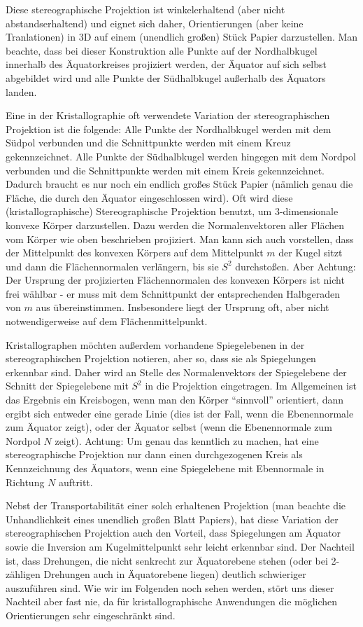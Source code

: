  Diese stereographische Projektion ist winkelerhaltend (aber nicht abstandserhaltend) und eignet sich daher, Orientierungen  (aber keine Tranlationen) in 3D auf einem (unendlich großen) Stück Papier darzustellen. Man beachte, dass bei dieser Konstruktion alle Punkte auf der Nordhalbkugel innerhalb des Äquatorkreises projiziert werden, der Äquator auf sich selbst abgebildet wird und alle Punkte der Südhalbkugel außerhalb des Äquators landen. 

Eine in der Kristallographie oft verwendete Variation der stereographischen Projektion ist die folgende: Alle Punkte der Nordhalbkugel werden mit dem Südpol verbunden und die Schnittpunkte werden mit einem Kreuz gekennzeichnet. Alle Punkte der Südhalbkugel werden hingegen mit dem Nordpol verbunden und die Schnittpunkte werden mit einem Kreis gekennzeichnet. Dadurch braucht es nur noch ein endlich großes Stück Papier (nämlich genau die Fläche, die durch den Äquator eingeschlossen wird).
Oft wird diese (kristallographische) Stereographische Projektion benutzt, um 3-dimensionale konvexe Körper darzustellen. Dazu werden die Normalenvektoren aller Flächen vom Körper wie oben beschrieben projiziert. Man kann sich auch vorstellen, dass der Mittelpunkt des konvexen Körpers auf dem Mittelpunkt $m$ der Kugel sitzt und dann die Flächennormalen verlängern, bis sie $S^2$ durchstoßen. Aber Achtung: Der Ursprung der projizierten Flächennormalen des konvexen Körpers ist nicht frei wählbar - er muss mit dem Schnittpunkt der entsprechenden Halbgeraden von $m$ aus übereinstimmen. Insbesondere liegt der Ursprung oft, aber nicht notwendigerweise auf dem Flächenmittelpunkt.

Kristallographen möchten außerdem vorhandene Spiegelebenen in der stereographischen Projektion notieren, aber so, dass sie als Spiegelungen erkennbar sind. Daher wird an Stelle des Normalenvektors der Spiegelebene der Schnitt der Spiegelebene mit $S^2$ in die Projektion eingetragen. Im Allgemeinen ist das Ergebnis ein Kreisbogen, wenn man den Körper \enquote{sinnvoll} orientiert, dann ergibt sich entweder eine gerade Linie (dies ist der Fall, wenn die Ebenennormale zum Äquator zeigt), oder der Äquator selbst (wenn die Ebenennormale zum Nordpol $N$ zeigt). Achtung: Um genau das kenntlich zu machen, hat eine stereographische Projektion nur dann einen durchgezogenen Kreis als Kennzeichnung des Äquators, wenn eine Spiegelebene mit Ebennormale in Richtung $N$ auftritt.
 
Nebst der Transportabilität einer solch erhaltenen Projektion (man beachte die Unhandlichkeit eines unendlich großen Blatt Papiers), hat diese Variation der stereographischen Projektion auch den Vorteil, dass Spiegelungen am Äquator sowie die Inversion am Kugelmittelpunkt sehr leicht erkennbar sind. Der Nachteil ist, dass Drehungen, die nicht senkrecht zur Äquatorebene stehen (oder bei 2-zähligen Drehungen  auch in Äquatorebene liegen) deutlich schwieriger auszuführen sind. Wie wir im Folgenden noch sehen werden, stört uns dieser Nachteil aber fast nie, da für kristallographische Anwendungen die möglichen Orientierungen sehr eingeschränkt sind.